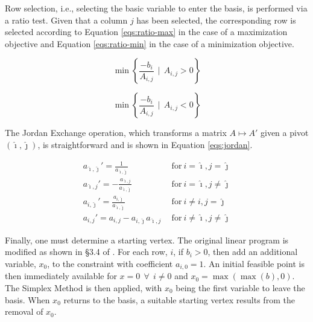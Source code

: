 Row selection, i.e., selecting the basic variable to enter the basis, is
performed via a ratio test. Given that a column $j$ has been selected, the
corresponding row is selected according to Equation \ref{eqs:ratio-max} in the
case of a maximization objective and Equation \ref{eqs:ratio-min} in the case of
a minimization objective.

\begin{equation}\label{eqs:ratio-max}
  \min \left\{ \frac{-b_i}{A_{i,j}} \:\: | \:\: A_{i,j} > 0 \right\}
\end{equation}

\begin{equation}\label{eqs:ratio-min}
  \min \left\{ \frac{-b_i}{A_{i,j}} \:\: | \:\: A_{i,j} < 0 \right\}
\end{equation}

The Jordan Exchange operation, which transforms a matrix $A \mapsto A'$
given a pivot $(\hat{\imath}, \hat{\jmath})$, is straightforward and is shown in
Equation \ref{eqs:jordan}.

\begin{subequations}\label{eqs:jordan}
  \begin{align}
    a_{\hat{\imath},\hat{\jmath}}' = \frac{1}{a_{\hat{\imath},\hat{\jmath}}}
    &\:\: \text{for} \:
    i = \hat{\imath}, j = \hat{\jmath} \\
    a_{\hat{\imath},j}' = -\frac{a_{\hat{\imath},j}}{a_{\hat{\imath},\hat{\jmath}}}
    &\:\: \text{for} \:
    i = \hat{\imath}, j \neq \hat{\jmath} \\
    a_{i,\hat{\jmath}}' = \frac{a_{i,\hat{\jmath}}}{a_{\hat{\imath},\hat{\jmath}}}
    &\:\: \text{for} \:
    i \neq i, j = \hat{\jmath} \\
    a_{i,j}' = a_{i,j} - a_{i,\hat{\jmath}} a_{\hat{\imath},j}
    &\:\: \text{for} \:
    i \neq \hat{\imath}, j \neq \hat{\jmath}
  \end{align}
\end{subequations}

Finally, one must determine a starting vertex. The original linear program is
modified as shown in \S 3.4 of \cite{ferris_linear_2008}. For each row, $i$, if
$b_i > 0$, then add an additional variable, $x_0$, to the constraint with
coefficient $a_{i,0} = 1$. An initial feasible point is then immediately
available for $x = 0 \:\: \forall \:\: i \neq 0$ and $x_0
= \max(\max(b),0)$. The Simplex Method is then applied, with $x_0$ being the
first variable to leave the basis. When $x_0$ returns to the basis, a suitable
starting vertex results from the removal of $x_0$.
